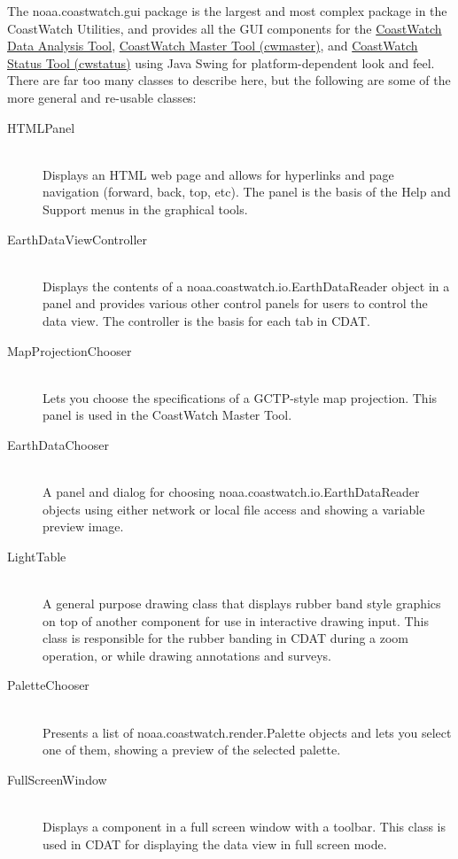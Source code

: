 The {\java noaa.coastwatch.gui} package is the largest and most
complex package in the CoastWatch Utilities, and provides all the
GUI components for the \hyperlink{cdatchap}{CoastWatch Data
Analysis Tool}, \hyperlink{cwmaster}{CoastWatch Master Tool
(cwmaster)}, and \hyperlink{cwstatus}{CoastWatch Status Tool
(cwstatus)} using Java Swing for platform-dependent look and
feel.  There are far too many classes to describe here, but the
following are some of the more general and re-usable classes:
\begin{description}

\item[{\java HTMLPanel}]~\\ Displays an HTML web page and allows
for hyperlinks and page navigation (forward, back, top, etc).
The panel is the basis of the {\gui Help and Support} menus in
the graphical tools.

\item[{\java EarthDataViewController}]~\\ Displays the contents
of a {\java noaa.coastwatch.io.EarthDataReader} object in a panel
and provides various other control panels for users to control
the data view.  The controller is the basis for each tab in CDAT.

\item[{\java MapProjectionChooser}]~\\ Lets you choose the
specifications of a GCTP-style map projection.  This panel is
used in the CoastWatch Master Tool.

\item[{\java EarthDataChooser}]~\\ A panel and dialog for
choosing {\java noaa.coastwatch.io.EarthDataReader} objects using
either network or local file access and showing a variable
preview image.

\item[{\java LightTable}]~\\ A general purpose drawing class that
displays rubber band style graphics on top of another component
for use in interactive drawing input.  This class is responsible
for the rubber banding in CDAT during a zoom operation, or while
drawing annotations and surveys.

\item[{\java PaletteChooser}]~\\ Presents a list of {\java
noaa.coastwatch.render.Palette} objects and lets you select one
of them, showing a preview of the selected palette.

\item[{\java FullScreenWindow}]~\\ Displays a component in a full
screen window with a toolbar.  This class is used in CDAT for
displaying the data view in full screen mode.

\end{description}

